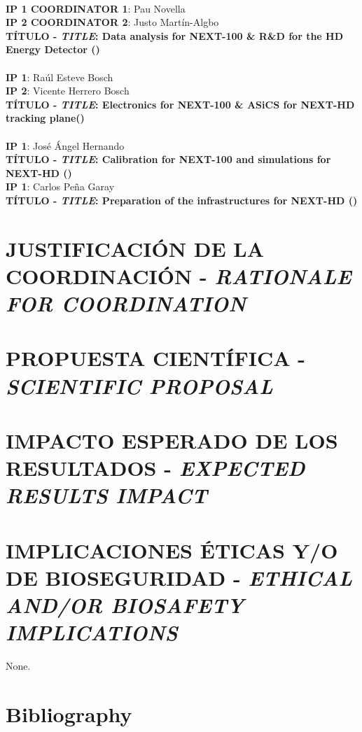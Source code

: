\documentclass[a4paper,11pt,oneside, english]{article}
\begin{document}
\\
{\bf IP 1 COORDINATOR 1}: Pau Novella\\
{\bf IP 2 COORDINATOR 2}: Justo Mart\'in-Algbo\\
{\bf T\'ITULO - \emph{TITLE}: Data analysis for NEXT-100 \& R\&D for the HD Energy Detector  (\sIFIC)}\\
\\
{\bf IP 1}: Ra\'ul Esteve Bosch\\
{\bf IP 2}: Vicente Herrero Bosch\\
{\bf T\'ITULO - \emph{TITLE}: Electronics for NEXT-100 \& ASiCS for NEXT-HD tracking plane(\sUPV)}\\
\\
{\bf IP 1}: Jos\'e \' Angel Hernando\\
{\bf T\'ITULO - \emph{TITLE}: Calibration for NEXT-100 and simulations for NEXT-HD (\sUSC)}
\\
{\bf IP 1}: Carlos Pe\~na Garay\\
{\bf T\'ITULO - \emph{TITLE}: Preparation of the infrastructures for NEXT-HD (\sLSC)}


\section{JUSTIFICACI\'ON DE LA COORDINACI\'ON - \emph{RATIONALE FOR COORDINATION}}
\label{sec.just}


\section{PROPUESTA CIENT\'IFICA - \emph{SCIENTIFIC PROPOSAL}}
\label{sec.proposal}






%
%
%
%
%
%
%

\section{IMPACTO ESPERADO DE LOS RESULTADOS - \emph{EXPECTED RESULTS IMPACT}}
\label{sec.impact}
%
%
\section{IMPLICACIONES \'ETICAS Y/O DE BIOSEGURIDAD - \emph{ETHICAL AND/OR BIOSAFETY IMPLICATIONS}}
\label{sec.ethics}
None.

\section{Bibliography}

%

\end{document}
